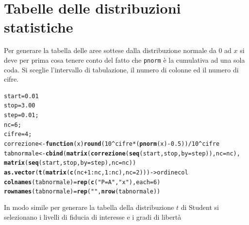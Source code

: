 \documentclass[onecolumn,12pt]{book}\usepackage[]{graphicx}\usepackage[]{color}
\makeatletter
\newcommand{\hlnum}[1]{\textcolor[rgb]{0.686,0.059,0.569}{#1}}%
\newcommand{\hlstr}[1]{\textcolor[rgb]{0.192,0.494,0.8}{#1}}%
\newcommand{\hlopt}[1]{\textcolor[rgb]{0,0,0}{#1}}%
\newcommand{\hlstd}[1]{\textcolor[rgb]{0.345,0.345,0.345}{#1}}%
\newcommand{\hlkwa}[1]{\textcolor[rgb]{0.161,0.373,0.58}{\textbf{#1}}}%
\newcommand{\hlkwb}[1]{\textcolor[rgb]{0.69,0.353,0.396}{#1}}%
\newcommand{\hlkwc}[1]{\textcolor[rgb]{0.333,0.667,0.333}{#1}}%
\newcommand{\hlkwd}[1]{\textcolor[rgb]{0.737,0.353,0.396}{\textbf{#1}}}%
\newenvironment{kframe}{%
 \def\at@end@of@kframe{}%
 \ifinner\ifhmode%
  \def\at@end@of@kframe{\end{minipage}}%
  \begin{minipage}{\columnwidth}%
 \fi\fi%
 \def\FrameCommand##1{\hskip\@totalleftmargin \hskip-\fboxsep
 \colorbox{shadecolor}{##1}\hskip-\fboxsep
     \hskip-\linewidth \hskip-\@totalleftmargin \hskip\columnwidth}%
 \MakeFramed {\advance\hsize-\width
   \@totalleftmargin\z@ \linewidth\hsize
   \@setminipage}}%
 {\par\unskip\endMakeFramed%
 \at@end@of@kframe}
\newenvironment{knitrout}{}{} %
\makeatother
\begin{document}
\chapter*{Tabelle delle distribuzioni statistiche}
Per generare la tabella delle aree sottese dalla distribuzione normale da 0 ad $x$ si deve per prima cosa tenere conto del fatto che \texttt{pnorm}  \`e la cumulativa ad una sola coda. Si sceglie l'intervallo di tabulazione, il numero di colonne ed il numero di cifre.
\begin{knitrout}
\color{fgcolor}\begin{kframe}
\begin{alltt}
\hlstd{start}\hlkwb{=}\hlnum{0.01}
\hlstd{stop}\hlkwb{=}\hlnum{3.00}
\hlstd{step}\hlkwb{=}\hlnum{0.01}\hlstd{;}
\hlstd{nc}\hlkwb{=}\hlnum{6}\hlstd{;}
\hlstd{cifre}\hlkwb{=}\hlnum{4}\hlstd{;}
\hlstd{correzione}\hlkwb{<-}\hlkwa{function}\hlstd{(}\hlkwc{x}\hlstd{)}  \hlkwd{round}\hlstd{(}\hlnum{10}\hlopt{^}\hlstd{cifre}\hlopt{*} \hlstd{(}\hlkwd{pnorm}\hlstd{(x)}\hlopt{-}\hlnum{0.5}\hlstd{))}\hlopt{/}\hlnum{10}\hlopt{^}\hlstd{cifre}
 \hlstd{tabnormale}\hlkwb{<-}\hlkwd{cbind}\hlstd{(}\hlkwd{matrix}\hlstd{(}\hlkwd{correzione}\hlstd{(}\hlkwd{seq}\hlstd{(start,stop,}\hlkwc{by}\hlstd{=step)),}\hlkwc{nc}\hlstd{=nc),}
 \hlkwd{matrix}\hlstd{(}\hlkwd{seq}\hlstd{(start,stop,}\hlkwc{by}\hlstd{=step),}\hlkwc{nc}\hlstd{=nc))}
\hlkwd{as.vector}\hlstd{(}\hlkwd{t}\hlstd{(}\hlkwd{matrix}\hlstd{(}\hlkwd{c}\hlstd{(nc}\hlopt{+}\hlnum{1}\hlopt{:}\hlstd{nc,}\hlnum{1}\hlopt{:}\hlstd{nc),}\hlkwc{nc}\hlstd{=}\hlnum{2}\hlstd{)))}\hlkwb{->}\hlstd{ordinecol}
\hlkwd{colnames}\hlstd{( tabnormale)}\hlkwb{=} \hlkwd{rep}\hlstd{(}\hlkwd{c}\hlstd{(} \hlstr{"P=A"}\hlstd{,}\hlstr{"x"}\hlstd{),}\hlkwc{each}\hlstd{=}\hlnum{6}\hlstd{)}
\hlkwd{rownames}\hlstd{( tabnormale)}\hlkwb{=}\hlkwd{rep}\hlstd{(}\hlstr{""}\hlstd{,}\hlkwd{nrow}\hlstd{( tabnormale))}
\end{alltt}
\end{kframe}
\end{knitrout}
In modo simile per generare la tabella della distribuzione $t$ di Student si selezionano i livelli di fiducia di interesse e  i gradi di libert\`a
\end{document}
